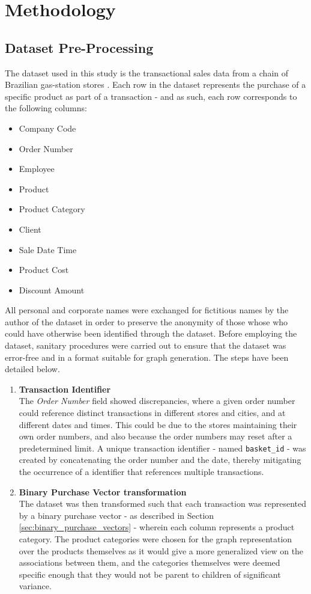
\chapter{Methodology}

\section{Dataset Pre-Processing}
The dataset used in this study is the transactional sales data from a chain of Brazilian gas-station stores \cite{data_source}.
Each row in the dataset represents the purchase of a specific product as part of a transaction - and as such, each row corresponds to the following columns:
\begin{itemize}
\item Company Code
\item Order Number
\item Employee
\item Product
\item Product Category
\item Client
\item Sale Date Time
\item Product Cost
\item Discount Amount
\end{itemize}
All personal and corporate names were exchanged for fictitious names by the author of the dataset in order to preserve the anonymity of those whose who could have otherwise been identified through the dataset. Before employing the dataset, sanitary procedures were carried out to ensure that the dataset was error-free and in a format suitable for graph generation. The steps have been detailed below.

\begin{enumerate}
\item \textbf{Transaction Identifier}\\
The \textit{Order Number} field showed discrepancies, where a given order number could reference distinct transactions in different stores and cities, and at different dates and times. 
This could be due to the stores maintaining their own order numbers, and also because the order numbers may reset after a predetermined limit.
A unique transaction identifier - named \texttt{basket\_id} - was created by concatenating the order number and the date, thereby mitigating the occurrence of a identifier that references multiple transactions.

\item \textbf{Binary Purchase Vector transformation}\\
The dataset was then transformed such that each transaction was represented by a binary purchase vector - as described in Section \ref{sec:binary_purchase_vectors} - wherein each column represents a product category. The product categories were chosen for the graph representation over the products themselves as it would give a more generalized view on the associations between them, and the categories themselves were deemed specific enough that they would not be parent to children of significant variance.

\end{enumerate} 
